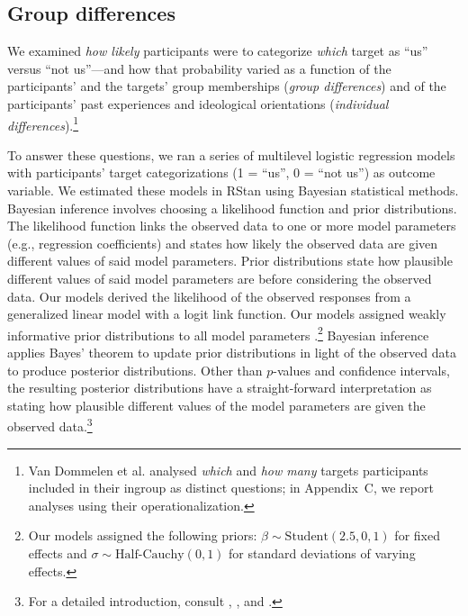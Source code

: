 \documentclass[12pt, a4paper]{article}
\begin{document}
\subsection{Group differences}

We examined \emph{how likely} participants were to categorize \emph{which} target as ``us'' versus ``not us''---and how that probability varied as a function of the participants' and the targets' group memberships (\emph{group differences}) and of the participants' past experiences and ideological orientations (\emph{individual differences}).\footnote{Van Dommelen et al. \citeyear{dommelen_construing_2015} analysed \emph{which} and \emph{how many} targets participants included in their ingroup as distinct questions; in Appendix~C, we report analyses using their operationalization.}

To answer these questions, we ran a series of multilevel logistic regression models with participants' target categorizations (1 = ``us'', 0 = ``not us'') as outcome variable. We estimated these models in RStan \cite{rstan_package} using Bayesian statistical methods. Bayesian inference involves choosing a likelihood function and prior distributions. The likelihood function links the observed data to one or more model parameters (e.g., regression coefficients) and states how likely the observed data are given different values of said model parameters. Prior distributions state how plausible different values of said model parameters are before considering the observed data. Our models derived the likelihood of the observed responses from a generalized linear model with a logit link function. Our models assigned weakly informative prior distributions to all model parameters \cite{gelman_prior_2017}.\footnote{Our models assigned the following priors: $\beta \sim \text{Student}(2.5, 0, 1)$ for fixed effects and $\sigma \sim \text{Half-Cauchy}(0, 1)$ for standard deviations of varying effects.}  Bayesian inference applies Bayes' theorem to update prior distributions in light of the observed data to produce posterior distributions. Other than $p$-values and confidence intervals, the resulting posterior distributions have a straight-forward interpretation as stating how plausible different values of the model parameters are given the observed data.\footnote{For a detailed introduction, consult , , and	 .} 
\end{document}
